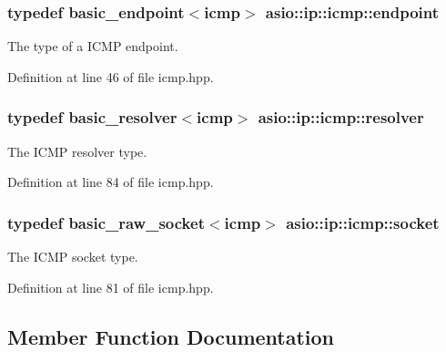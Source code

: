 \subsubsection[{endpoint}]{\setlength{\rightskip}{0pt plus 5cm}typedef {\bf basic\+\_\+endpoint}$<${\bf icmp}$>$ {\bf asio\+::ip\+::icmp\+::endpoint}}\label{classasio_1_1ip_1_1icmp_a3b92dc29eb90413d1dc80966c2d4b6ae}


The type of a I\+C\+M\+P endpoint. 



Definition at line 46 of file icmp.\+hpp.

\hypertarget{classasio_1_1ip_1_1icmp_a326f93699ba9f42654917e676fd967aa}{}
\subsubsection[{resolver}]{\setlength{\rightskip}{0pt plus 5cm}typedef {\bf basic\+\_\+resolver}$<${\bf icmp}$>$ {\bf asio\+::ip\+::icmp\+::resolver}}\label{classasio_1_1ip_1_1icmp_a326f93699ba9f42654917e676fd967aa}


The I\+C\+M\+P resolver type. 



Definition at line 84 of file icmp.\+hpp.

\hypertarget{classasio_1_1ip_1_1icmp_a97be192e262054c0adee620d89b9feab}{}
\subsubsection[{socket}]{\setlength{\rightskip}{0pt plus 5cm}typedef {\bf basic\+\_\+raw\+\_\+socket}$<${\bf icmp}$>$ {\bf asio\+::ip\+::icmp\+::socket}}\label{classasio_1_1ip_1_1icmp_a97be192e262054c0adee620d89b9feab}


The I\+C\+M\+P socket type. 



Definition at line 81 of file icmp.\+hpp.



\subsection{Member Function Documentation}
\hypertarget{classasio_1_1ip_1_1icmp_ad4d1df69e3630639c6d13d2c16b7dfba}{}
